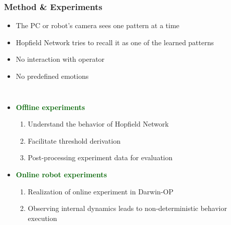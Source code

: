 \documentclass{beamer}
\begin{document}
\begin{frame}
\frametitle{Method \& Experiments}



\begin{block}{}\scriptsize
\begin{itemize}
\item The PC or robot’s camera sees one pattern at a time 
\item Hopfield Network tries to recall it as one of the learned patterns
\item No interaction with operator
\item No predefined emotions
\end{itemize}

\end{block}


\begin{columns}[l|c]
  \column{2.9in}  %

\begin{itemize}
\item \textcolor{darkgreen}{\textbf{Offline experiments}}
\begin{enumerate}\scriptsize
\item Understand the behavior of Hopfield Network
\item Facilitate threshold derivation
\item Post-processing experiment data for evaluation
\end{enumerate}

\item \textcolor{darkgreen}{\textbf{Online robot experiments}}
\begin{enumerate}\scriptsize
\item Realization of online experiment in Darwin-OP
\item Observing internal dynamics leads to
non-deterministic behavior execution

\end{enumerate}

\end{itemize}
  		
  		
\column{1.8in}

\end{columns}

 
\end{frame}

\end{document}
